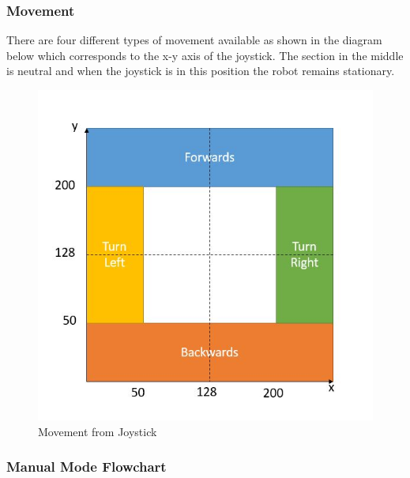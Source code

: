 \documentclass[MTRX3700report.tex]{subfiles}
\begin{document}
	\subsubsection{Movement}
	
	There are four different types of movement available as shown in the diagram below which corresponds to the x-y axis of the joystick. The section in the middle is neutral and when the joystick is in this position the robot remains stationary.
	
	\begin{figure}[h]
		\includegraphics[scale=0.8]{Manual_mode_movement.jpg}
		\centering
		\caption{Movement from Joystick}
	\end{figure}
	
	
	\subsubsection{Manual Mode Flowchart}
	
\end{document}
